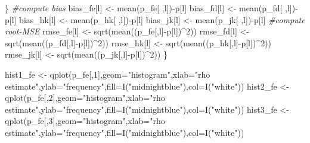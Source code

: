 \documentclass[
]{article}
\newenvironment{Shaded}{\begin{snugshade}}{\end{snugshade}}
\newcommand{\AttributeTok}[1]{\textcolor[rgb]{0.77,0.63,0.00}{#1}}
\newcommand{\CommentTok}[1]{\textcolor[rgb]{0.56,0.35,0.01}{\textit{#1}}}
\newcommand{\DecValTok}[1]{\textcolor[rgb]{0.00,0.00,0.81}{#1}}
\newcommand{\FunctionTok}[1]{\textcolor[rgb]{0.00,0.00,0.00}{#1}}
\newcommand{\NormalTok}[1]{#1}
\newcommand{\OtherTok}[1]{\textcolor[rgb]{0.56,0.35,0.01}{#1}}
\newcommand{\SpecialCharTok}[1]{\textcolor[rgb]{0.00,0.00,0.00}{#1}}
\newcommand{\StringTok}[1]{\textcolor[rgb]{0.31,0.60,0.02}{#1}}
\begin{document}
\begin{Shaded}
\begin{Highlighting}[]
\NormalTok{  \}}
  \CommentTok{\#compute bias}
\NormalTok{  bias\_fe[l] }\OtherTok{\textless{}{-}} \FunctionTok{mean}\NormalTok{(p\_fe[ ,l])}\SpecialCharTok{{-}}\NormalTok{p[l]}
\NormalTok{  bias\_fd[l] }\OtherTok{\textless{}{-}} \FunctionTok{mean}\NormalTok{(p\_fd[ ,l])}\SpecialCharTok{{-}}\NormalTok{p[l]}
\NormalTok{  bias\_hk[l] }\OtherTok{\textless{}{-}} \FunctionTok{mean}\NormalTok{(p\_hk[ ,l])}\SpecialCharTok{{-}}\NormalTok{p[l]}
\NormalTok{  bias\_jk[l] }\OtherTok{\textless{}{-}} \FunctionTok{mean}\NormalTok{(p\_jk[ ,l])}\SpecialCharTok{{-}}\NormalTok{p[l]}
  \CommentTok{\#compute root{-}MSE}
\NormalTok{  rmse\_fe[l] }\OtherTok{\textless{}{-}} \FunctionTok{sqrt}\NormalTok{(}\FunctionTok{mean}\NormalTok{((p\_fe[,l]}\SpecialCharTok{{-}}\NormalTok{p[l])}\SpecialCharTok{\^{}}\DecValTok{2}\NormalTok{))}
\NormalTok{  rmse\_fd[l] }\OtherTok{\textless{}{-}} \FunctionTok{sqrt}\NormalTok{(}\FunctionTok{mean}\NormalTok{((p\_fd[,l]}\SpecialCharTok{{-}}\NormalTok{p[l])}\SpecialCharTok{\^{}}\DecValTok{2}\NormalTok{))}
\NormalTok{  rmse\_hk[l] }\OtherTok{\textless{}{-}} \FunctionTok{sqrt}\NormalTok{(}\FunctionTok{mean}\NormalTok{((p\_hk[,l]}\SpecialCharTok{{-}}\NormalTok{p[l])}\SpecialCharTok{\^{}}\DecValTok{2}\NormalTok{))}
\NormalTok{  rmse\_jk[l] }\OtherTok{\textless{}{-}} \FunctionTok{sqrt}\NormalTok{(}\FunctionTok{mean}\NormalTok{((p\_jk[,l]}\SpecialCharTok{{-}}\NormalTok{p[l])}\SpecialCharTok{\^{}}\DecValTok{2}\NormalTok{))}
\NormalTok{\}}

\NormalTok{hist1\_fe }\OtherTok{\textless{}{-}} \FunctionTok{qplot}\NormalTok{(p\_fe[,}\DecValTok{1}\NormalTok{],}\AttributeTok{geom=}\StringTok{"histogram"}\NormalTok{,}\AttributeTok{xlab=}\StringTok{"rho estimate"}\NormalTok{,}\AttributeTok{ylab=}\StringTok{"frequency"}\NormalTok{,}\AttributeTok{fill=}\FunctionTok{I}\NormalTok{(}\StringTok{"midnightblue"}\NormalTok{),}\AttributeTok{col=}\FunctionTok{I}\NormalTok{(}\StringTok{"white"}\NormalTok{)) }
\NormalTok{hist2\_fe }\OtherTok{\textless{}{-}} \FunctionTok{qplot}\NormalTok{(p\_fe[,}\DecValTok{2}\NormalTok{],}\AttributeTok{geom=}\StringTok{"histogram"}\NormalTok{,}\AttributeTok{xlab=}\StringTok{"rho estimate"}\NormalTok{,}\AttributeTok{ylab=}\StringTok{"frequency"}\NormalTok{,}\AttributeTok{fill=}\FunctionTok{I}\NormalTok{(}\StringTok{"midnightblue"}\NormalTok{),}\AttributeTok{col=}\FunctionTok{I}\NormalTok{(}\StringTok{"white"}\NormalTok{)) }
\NormalTok{hist3\_fe }\OtherTok{\textless{}{-}} \FunctionTok{qplot}\NormalTok{(p\_fe[,}\DecValTok{3}\NormalTok{],}\AttributeTok{geom=}\StringTok{"histogram"}\NormalTok{,}\AttributeTok{xlab=}\StringTok{"rho estimate"}\NormalTok{,}\AttributeTok{ylab=}\StringTok{"frequency"}\NormalTok{,}\AttributeTok{fill=}\FunctionTok{I}\NormalTok{(}\StringTok{"midnightblue"}\NormalTok{),}\AttributeTok{col=}\FunctionTok{I}\NormalTok{(}\StringTok{"white"}\NormalTok{)) }


\end{Highlighting}
\end{Shaded}
\end{document}
